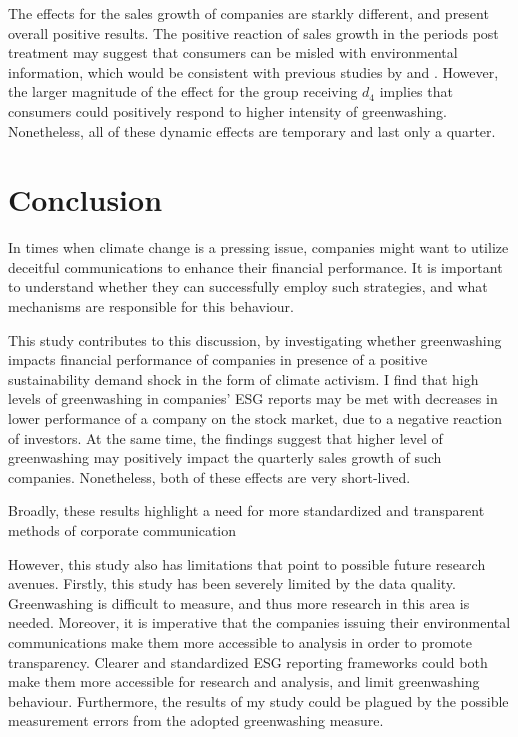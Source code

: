 \documentclass[12pt]{article}
\begin{document}
The effects for the sales growth of companies are starkly different, and present overall positive results. The positive reaction of sales growth in the periods post treatment may suggest that consumers can be misled with environmental information, which would be consistent with previous studies by \citeauthor{schmuckMisleadingConsumersGreen2018} and \citeauthor{parguelCanEvokingNature2015}. However, the larger magnitude of the effect for the group receiving $d_4$ implies that consumers could positively respond to higher intensity of greenwashing. Nonetheless, all of these dynamic effects are temporary and last only a quarter.


\section{Conclusion}\label{sect:discussion}


In times when climate change is a pressing issue, companies might want to utilize deceitful communications to enhance their financial performance. It is important to understand whether they can successfully employ such strategies, and what mechanisms are responsible for this behaviour. 

This study contributes to this discussion, by investigating whether greenwashing impacts financial performance of companies in presence of a positive sustainability demand shock in the form of climate activism. I find that high levels of greenwashing in companies' ESG reports may be met with decreases in lower performance of a company on the stock market, due to a negative reaction of investors. At the same time, the findings suggest that higher level of greenwashing may positively impact the quarterly sales growth of such companies. Nonetheless, both of these effects are very short-lived. 

Broadly, these results highlight a need for more standardized and transparent methods of corporate communication

However, this study also has limitations that point to possible future research avenues. Firstly, this study has been severely limited by the data quality. Greenwashing is difficult to measure, and thus more research in this area is needed. Moreover, it is imperative that the companies issuing their environmental communications make them more accessible to analysis in order to promote transparency. Clearer and standardized ESG reporting frameworks could both make them more accessible for research and analysis, and limit greenwashing behaviour. Furthermore, the results of my study could be plagued by the possible measurement errors from the adopted greenwashing measure. 
\end{document}
